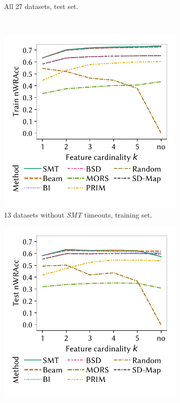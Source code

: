 \documentclass[acmsmall]{acmart} %
\theoremstyle{acmplain}
\theoremstyle{acmdefinition}
\begin{document}
\begin{figure}[t]
\begin{subfigure}[t]{0.48\textwidth}
		\caption{All 27 datasets, test set.}
		\label{fig:csd:cardinality-test-nwracc-all-datasets}
	\end{subfigure}
	\\ \vspace{\baselineskip}
	\begin{subfigure}[t]{0.48\textwidth}
		\centering
		\includegraphics[width=\textwidth, trim=10 25 10 10, clip]{plots/csd-cardinality-train-nwracc-no-timeout-datasets.pdf}
		\caption{13 datasets without \emph{SMT} timeouts, training set.}
		\label{fig:csd:cardinality-train-nwracc-no-timeout-datasets}
	\end{subfigure}
	\hfill
	\begin{subfigure}[t]{0.48\textwidth}
		\centering
		\includegraphics[width=\textwidth, trim=10 25 10 10, clip]{plots/csd-cardinality-test-nwracc-no-timeout-datasets.pdf}

\end{subfigure}
\end{figure}
\end{document}
